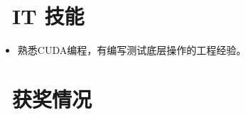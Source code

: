 \documentclass{resume}
\begin{document}
	\section{\faCogs\ IT 技能}
	\begin{itemize}[parsep=0.5ex]
		\item 熟悉CUDA编程，有编写测试底层操作的工程经验。
	\end{itemize}
	\vspace{-0.5em}
	
	\section{\faHeartO\ 获奖情况}
	
	
\end{document}
